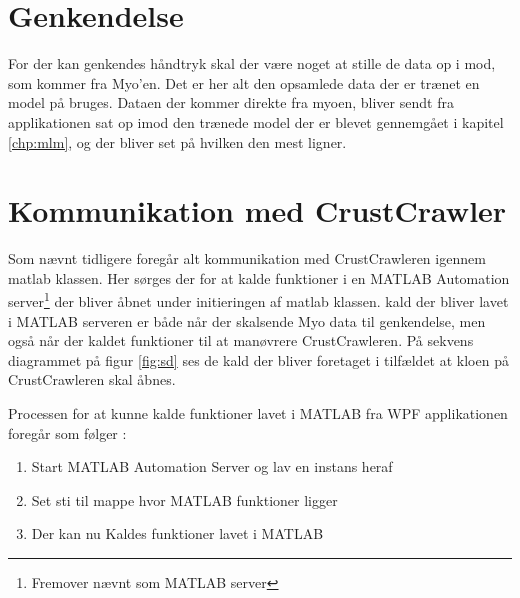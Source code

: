 \section{Genkendelse}
For der kan genkendes håndtryk skal der være noget at stille de data op i mod, som kommer fra Myo'en. Det er her alt den opsamlede data der er trænet en model på bruges. Dataen der kommer direkte fra myoen, bliver sendt fra applikationen sat op imod den trænede model der er blevet gennemgået i kapitel \ref{chp:mlm}, og der bliver set på hvilken den mest ligner. 




\section{Kommunikation med CrustCrawler}
\label{sec:ktc}
Som nævnt tidligere foregår alt kommunikation med CrustCrawleren igennem matlab klassen. Her sørges der for at kalde funktioner i en MATLAB Automation server\footnote{Fremover nævnt som MATLAB server} der bliver åbnet under initieringen af matlab klassen. kald der bliver lavet i MATLAB serveren er både når der skalsende Myo data til genkendelse, men også når der kaldet funktioner til at manøvrere CrustCrawleren. På sekvens diagrammet på figur \ref{fig:sd} ses de kald der bliver foretaget i tilfældet at kloen på CrustCrawleren skal åbnes.


Processen for at kunne kalde funktioner lavet i MATLAB fra WPF applikationen foregår som følger \citep{RefWorks:15}:
\begin{enumerate}
	\item Start MATLAB Automation Server og lav en instans heraf
	\item Set sti til mappe hvor MATLAB funktioner ligger
	\item Der kan nu Kaldes funktioner lavet i MATLAB
\end{enumerate}

